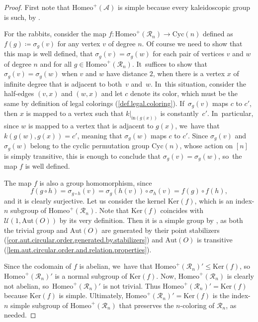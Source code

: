 \documentclass[JEP,XML,SOM,Unicode,NoFloatCountersInSection,published]{cedram}
\theoremstyle{plain}
\theoremstyle{definition}
\theoremstyle{remark}
\newcommand{\Aut}{\mathrm{Aut}}
\newcommand{\Cyc}{\mathrm{Cyc}}
\newcommand{\Homeo}{\mathrm{Homeo}}
\newcommand{\A}{\mathcal{A}}
\newcommand{\R}{\mathcal{R}}
\newcommand{\U}{\mathcal{U}}
\begin{document}
\begin{proof}
First note that $\Homeo^+(\A)$ is simple because every kaleidoscopic group is such, by \cite[Th.\,1.1]{Kaleidoscopic}.

For the rabbits, consider the map $f \colon \Homeo^+(\R_n) \to \Cyc(n)$ defined as $f(g) \coloneqq \sigma_g(v)$ for any vertex $v$ of degree $n$.
Of course we need to show that this map is well defined, \ie that $\sigma_g(v) = \sigma_g(w)$ for each pair of vertices $v$ and $w$ of degree $n$ and for all $g \in \Homeo^+(\R_n)$. It~suffices to show that $\sigma_g(v) = \sigma_g(w)$ when $v$ and $w$ have distance $2$, \ie when there is a vertex $x$ of infinite degree that is adjacent to both~$v$ and~$w$. In~this situation, consider the half-edges $(v,x)$ and $(w,x)$ and let $c$ denote its color, which must be the same by definition of legal colorings (\cref{def.legal.coloring}). If~$\sigma_g(v)$ maps $c$ to $c'$, then $x$ is mapped to a vertex such that $k|_{\mathrm{in}(g(x))}$ is constantly~$c'$. In~particular, since $w$ is mapped to a vertex that is adjacent to $g(x)$, we~have that $k(g(w),g(x)) = c'$, meaning that $\sigma_g(w)$ maps $c$ to $c'$.
Since $\sigma_g(v)$ and $\sigma_g(w)$ belong to the cyclic permutation group $\Cyc(n)$, whose action on $[n]$ is simply transitive, this is enough to conclude that $\sigma_g(v) = \sigma_g(w)$, so~the map $f$ is well defined.

The map $f$ is also a group homomorphism, since
\[
f(g \circ h) = \sigma_{g \circ h}(v) = \sigma_g(h(v)) \circ \sigma_h(v) = f(g) \circ f(h),
\]
and it is clearly surjective.
Let us consider the kernel $\mathrm{Ker}(f)$, which is an index-$n$ subgroup of $\Homeo^+(\R_n)$.
Note that $\mathrm{Ker}(f)$ coincides with $\U(1,\Aut(O))$ by its very definition.
Then it is a simple group by \cite[Th.\,23]{biregular}, as both the trivial group and $\Aut(O)$ are generated by their point stabilizers (\cref{cor.aut.circular.order.generated.by.stabilizers}) and $\Aut(O)$ is transitive (\cref{lem.aut.circular.order.and.relation.properties}).

Since the codomain of $f$ is abelian, we~have that $\Homeo^+(\R_n)' \leq \mathrm{Ker}(f)$, so~$\Homeo^+(\R_n)'$ is a normal subgroup of $\mathrm{Ker}(f)$.
Now, $\Homeo^+(\R_n)$ is clearly not abelian, so~$\Homeo^+(\R_n)'$ is not trivial.
Thus $\Homeo^+(\R_n)' = \mathrm{Ker}(f)$ because $\mathrm{Ker}(f)$ is simple.
Ultimately, $\Homeo^+(\R_n)' = \mathrm{Ker}(f)$ is the index-$n$ simple subgroup of $\Homeo^+(\R_n)$ that preserves the $n$-coloring of $\R_n$, as needed.
\end{proof}
\end{document}
